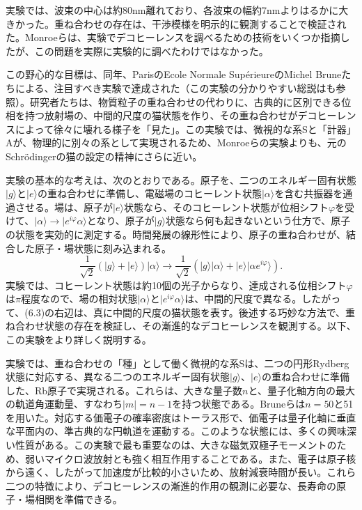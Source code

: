 実験では、波束の中心は約80nm離れており、各波束の幅約7nmよりはるかに大きかった。重ね合わせの存在は、干渉模様を明示的に観測することで検証された。Monroeらは、実験でデコヒーレンスを調べるための技術をいくつか指摘したが、この問題を実際に実験的に調べたわけではなかった。

この野心的な目標は、同年、ParisのEcole Normale SupérieureのMichel Bruneたちによる、注目すべき実験\cite{ref247}で達成された（この実験の分かりやすい総説は\cite{ref248}も参照）。研究者たちは、物質粒子の重ね合わせの代わりに、古典的に区別できる位相を持つ放射場の、中間的尺度の猫状態を作り、その重ね合わせがデコヒーレンスによって徐々に壊れる様子を「見た」。この実験では、微視的な系Sと「計器」Aが、物理的に別々の系として実現されるため、Monroeらの実験よりも、元のSchrödingerの猫の設定の精神にさらに近い。

実験の基本的な考えは、次のとおりである。原子を、二つのエネルギー固有状態$|g\rangle$と$|e\rangle$の重ね合わせに準備し、電磁場のコヒーレント状態$|\alpha\rangle$を含む共振器を通過させる。場は、原子が$|e\rangle$状態なら、そのコヒーレント状態が位相シフト$\varphi$を受けて、$|\alpha\rangle\to|e^{i\varphi}\alpha\rangle$となり、原子が$|g\rangle$状態なら何も起きないという仕方で、原子の状態を実効的に測定する。時間発展の線形性により、原子の重ね合わせが、結合した原子・場状態に刻み込まれる。
\begin{equation}
\frac1{\sqrt2}(|g\rangle+|e\rangle)|\alpha\rangle
\longrightarrow\frac1{\sqrt2}(|g\rangle|\alpha\rangle+|e\rangle|\alpha e^{i\varphi}\rangle).\tag{6.3}
\end{equation}
実験では、コヒーレント状態は約10個の光子からなり、達成される位相シフト$\varphi$は$\pi$程度なので、場の相対状態$|\alpha\rangle$と$|e^{i\varphi}\alpha\rangle$は、中間的尺度で異なる。したがって、(6.3)の右辺は、真に中間的尺度の猫状態を表す。後述する巧妙な方法で、重ね合わせ状態の存在を検証し、その漸進的なデコヒーレンスを観測する。以下、この実験をより詳しく説明する。

\hypertarget{srcpage:246}{}\label{srcpage:246}
実験では、重ね合わせの「種」として働く微視的な系Sは、二つの円形Rydberg状態に対応する、異なる二つのエネルギー固有状態$|g\rangle$、$|e\rangle$の重ね合わせに準備した、Rb原子で実現される。これらは、大きな量子数$n$と、量子化軸方向の最大の軌道角運動量、すなわち$|m|=n-1$を持つ状態である。Bruneら\cite{ref247}は$n=50$と51を用いた。対応する価電子の確率密度はトーラス形で、価電子は量子化軸に垂直な平面内の、準古典的な円軌道を運動する。このような状態には、多くの興味深い性質がある。この実験で最も重要なのは、大きな磁気双極子モーメントのため、弱いマイクロ波放射とも強く相互作用することである。また、電子は原子核から遠く、したがって加速度が比較的小さいため、放射減衰時間が長い。これら二つの特徴により、デコヒーレンスの漸進的作用の観測に必要な、長寿命の原子・場相関を準備できる。

